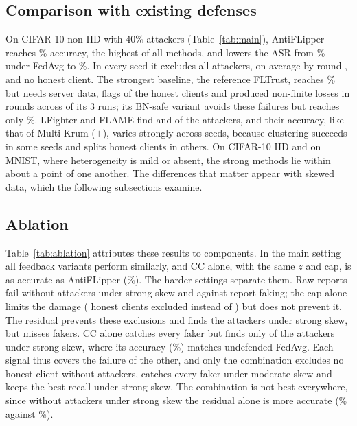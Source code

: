 \documentclass[journal]{IEEEtran}
\begin{document}
\subsection{Comparison with existing defenses}
\label{sec:res-main}
On CIFAR-10 non-IID with 40\% attackers (Table~\ref{tab:main}), AntiFLipper reaches \headAcc\% accuracy, the highest of all methods, and lowers the ASR from \headASRFedAvg\% under FedAvg to \headASR\%. In every seed it excludes all attackers, on average by round \headDet, and no honest client. The strongest baseline, the reference FLTrust, reaches \headAccFLTrust\% but needs server data, flags \headFPRFLTrust{} of the honest clients and produced non-finite losses in \fltrustNanRounds{} rounds across \fltrustNanRuns{} of its 3 runs; its BN-safe variant avoids these failures but reaches only \bnsafeHead\%. LFighter and FLAME find \headRecallLFighter{} and \headRecallFLAME{} of the attackers, and their accuracy, like that of Multi-Krum ($\pm$\headAccKrumStd), varies strongly across seeds, because clustering succeeds in some seeds and splits honest clients in others. On CIFAR-10 IID and on MNIST, where heterogeneity is mild or absent, the strong methods lie within about a point of one another. The differences that matter appear with skewed data, which the following subsections examine.

\subsection{Ablation}
\label{sec:res-ablation}
Table~\ref{tab:ablation} attributes these results to components. In the main setting all feedback variants perform similarly, and CC alone, with the same $z$ and cap, is as accurate as AntiFLipper (\ccHeadAcc\%). The harder settings separate them. Raw reports fail without attackers under strong skew and against report faking; the cap alone limits the damage (\cleanHonBudget{} honest clients excluded instead of \cleanHonRaw) but does not prevent it. The residual prevents these exclusions and finds the attackers under strong skew, but misses fakers. CC alone catches every faker but finds only \ccSkewRecall{} of the attackers under strong skew, where its accuracy (\ccSkewAcc\%) matches undefended FedAvg. Each signal thus covers the failure of the other, and only the combination excludes no honest client without attackers, catches every faker under moderate skew and keeps the best recall under strong skew. The combination is not best everywhere, since without attackers under strong skew the residual alone is more accurate (\cleanAccCROnly\% against \cleanAcc\%).
\end{document}
